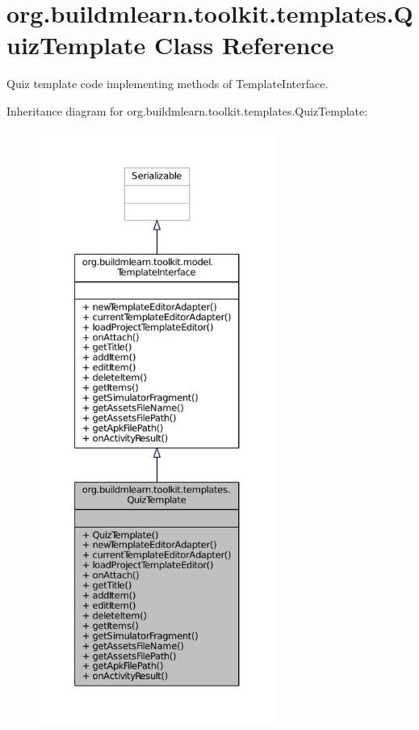 \hypertarget{classorg_1_1buildmlearn_1_1toolkit_1_1templates_1_1QuizTemplate}{\section{org.\-buildmlearn.\-toolkit.\-templates.\-Quiz\-Template Class Reference}
\label{classorg_1_1buildmlearn_1_1toolkit_1_1templates_1_1QuizTemplate}
}


Quiz template code implementing methods of Template\-Interface.  




Inheritance diagram for org.\-buildmlearn.\-toolkit.\-templates.\-Quiz\-Template\-:
\nopagebreak
\begin{figure}[H]
\begin{center}
\leavevmode
\includegraphics[height=550pt]{d8/db8/classorg_1_1buildmlearn_1_1toolkit_1_1templates_1_1QuizTemplate__inherit__graph}
\end{center}
\end{figure}



